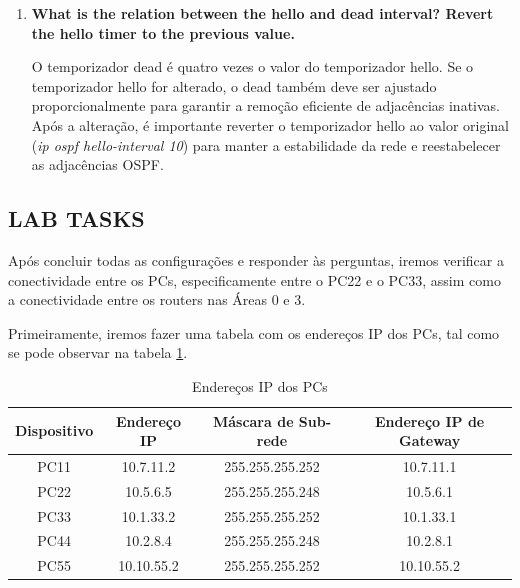 \documentclass[11pt,english, openright, oneside]{book}
\begin{document}
\begin{enumerate}
  \item \textbf{What is the relation between the hello and dead interval? Revert the hello timer to the previous value.}
  \vspace{0.2cm}

  \par O temporizador dead é quatro vezes o valor do temporizador hello. Se o temporizador hello for alterado, o dead também deve ser ajustado proporcionalmente para garantir a remoção eficiente de adjacências inativas. Após a alteração, é importante reverter o temporizador hello ao valor original (\textit{ip ospf hello-interval 10}) para manter a estabilidade da rede e reestabelecer as adjacências OSPF.
\end{enumerate}
\vspace{0.2cm}

\subsection{LAB TASKS}
\vspace{0.2cm}

Após concluir todas as configurações e responder às perguntas, iremos verificar a conectividade entre os PCs, especificamente entre o PC22 e o PC33, assim como a conectividade entre os routers nas Áreas 0 e 3.
\vspace{0.2cm}

Primeiramente, iremos fazer uma tabela com os endereços IP dos PCs, tal como se pode observar na tabela \ref{tab:ip2}.

\begin{table}[H]
\centering
\begin{tabular}{|c|c|c|c|}
\hline
\textbf{Dispositivo} & \textbf{Endereço IP} & \textbf{Máscara de Sub-rede} & \textbf{Endereço IP de Gateway}\\ \hline
PC11 & 10.7.11.2 & 255.255.255.252 & 10.7.11.1 \\ \hline 
PC22 & 10.5.6.5 & 255.255.255.248 & 10.5.6.1 \\ \hline
PC33 & 10.1.33.2 & 255.255.255.252 & 10.1.33.1 \\ \hline
PC44 & 10.2.8.4 & 255.255.255.248 & 10.2.8.1 \\ \hline
PC55 & 10.10.55.2 & 255.255.255.252 & 10.10.55.2\\ \hline
\end{tabular}
\caption{Endereços IP dos PCs}
\label{tab:ip2}
\end{table}
\vspace{0.2cm}
\end{document}
